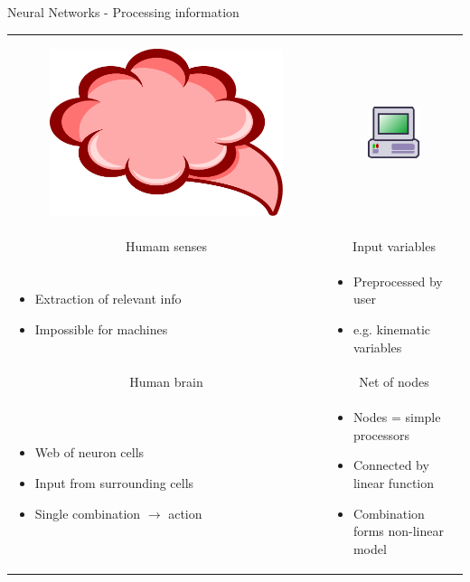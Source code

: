 \begin{frame}{Neural Networks - Processing information}
\begin{tabular}{p{5cm}|p{5cm}}
    \begin{figure}
    	\includegraphics[scale = 0.09]{brain}
    \end{figure}
    & 
    \begin{figure}
    	\includegraphics[scale = 1.4]{machine}
    \end{figure} \\
  \multicolumn{1}{c|}{Humam senses} & \multicolumn{1}{c}{Input variables} \\
    \begin{itemize}
        \item Extraction of relevant info
        \item Impossible for machines
    \end{itemize}
    & 
    \begin{itemize}
      \item Preprocessed by user
      \item {e.g.} kinematic variables
    \end{itemize} \\
\multicolumn{1}{c|}{Human brain} & \multicolumn{1}{c}{Net of nodes} \\
    \begin{itemize}
        \item Web of neuron cells
        \item Input from surrounding cells
        \item Single combination $\rightarrow$ action
    \end{itemize}
    & 
    \begin{itemize}
      \item Nodes = simple processors
      \item Connected by linear function
      \item Combination forms non-linear model
    \end{itemize} 
 \end{tabular}
\end{frame}


